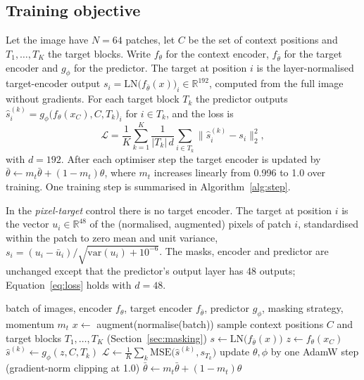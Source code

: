 \documentclass[pdflatex,sn-basic]{sn-jnl}%
\begin{document}
\subsection{Training objective}\label{sec:objective}
Let the image have $N=64$ patches, let $C$ be the set of context positions and $T_1,\dots,T_K$ the target blocks. Write $f_\theta$ for the context encoder, $f_{\bar\theta}$ for the target encoder and $g_\phi$ for the predictor. The target at position $i$ is the layer-normalised target-encoder output $s_i=\mathrm{LN}\big(f_{\bar\theta}(x)\big)_i\in\mathbb{R}^{192}$, computed from the full image without gradients. For each target block $T_k$ the predictor outputs $\hat s^{(k)}_i = g_\phi\big(f_\theta(x_C), C, T_k\big)_i$ for $i\in T_k$, and the loss is
\begin{equation}
\mathcal{L}=\frac{1}{K}\sum_{k=1}^{K}\frac{1}{|T_k|\,d}\sum_{i\in T_k}\big\lVert \hat s^{(k)}_i - s_i\big\rVert_2^2 ,
\label{eq:loss}
\end{equation}
with $d=192$. After each optimiser step the target encoder is updated by $\bar\theta\leftarrow m_t\bar\theta+(1-m_t)\theta$, where $m_t$ increases linearly from 0.996 to 1.0 over training. One training step is summarised in Algorithm~\ref{alg:step}.

In the \emph{pixel-target} control there is no target encoder. The target at position $i$ is the vector $u_i\in\mathbb{R}^{48}$ of the (normalised, augmented) pixels of patch $i$, standardised within the patch to zero mean and unit variance, $s_i=(u_i-\bar u_i)/\sqrt{\mathrm{var}(u_i)+10^{-6}}$. The masks, encoder and predictor are unchanged except that the predictor's output layer has 48 outputs; Equation~\ref{eq:loss} holds with $d=48$.

\begin{algorithm}[t]
\caption{One training step (feature-space targets).}\label{alg:step}
\begin{algorithmic}[1]
\Require batch of images, encoder $f_\theta$, target encoder $f_{\bar\theta}$, predictor $g_\phi$, masking strategy, momentum $m_t$
\State $x \gets$ augment(normalise(batch))
\State sample context positions $C$ and target blocks $T_1,\dots,T_K$ (Section~\ref{sec:masking})
\State $s \gets \mathrm{LN}\big(f_{\bar\theta}(x)\big)$ 
\State $z \gets f_\theta(x_C)$ 
  \State $\hat s^{(k)} \gets g_\phi(z, C, T_k)$
\EndFor
\State $\mathcal{L} \gets \frac{1}{K}\sum_k \mathrm{MSE}\big(\hat s^{(k)}, s_{T_k}\big)$
\State update $\theta,\phi$ by one AdamW step (gradient-norm clipping at 1.0)
\State $\bar\theta \gets m_t\bar\theta + (1-m_t)\theta$
\end{algorithmic}
\end{algorithm}
\end{document}
